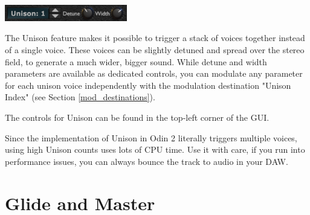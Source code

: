 \begin{center}
    \includegraphics[width=0.4\textwidth]{graphics/unison.png}
\end{center}

The Unison feature makes it possible to trigger a stack of voices together instead of a single voice. These voices can be slightly detuned and spread over the stereo field, to generate a much wider, bigger sound. While detune and width parameters are available as dedicated controls, you can modulate any parameter for each unison voice independently with the modulation destination "Unison Index" (see Section \ref{mod_destinations}).

\vspace{3mm}
The controls for Unison can be found in the top-left corner of the GUI.

\vspace{3mm}
\begin{tcolorbox}[colback=yellow!10!white,
        colframe=white!20!black,
        center,
        valign=top,
        halign=left,
        center title,
        width=\textwidth]

    Since the implementation of Unison in Odin 2 literally triggers multiple voices, using high Unison counts uses lots of CPU time. Use it with care, if you run into performance issues, you can always bounce the track to audio in your DAW.
\end{tcolorbox}




\section{Glide and Master}
\label{glide}

